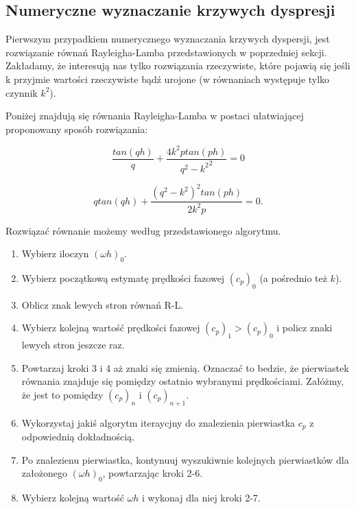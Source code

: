 
\subsection{Numeryczne wyznaczanie krzywych dyspresji}
Pierwszym przypadkiem numerycznego wyznaczania krzywych dyspersji, jest rozwiązanie równań Rayleigha-Lamba przedstawionych w poprzedniej sekcji. Zakładamy, że interesują nas tylko rozwiązania rzeczywiste, które pojawią się jeśli k przyjmie wartości rzeczywiste bądź urojone (w równaniach występuje tylko czynnik \(k^2\)).

Poniżej znajdują się równania Rayleigha-Lamba w postaci ułatwiającej proponowany sposób rozwiązania:

\begin{equation}
\frac{tan(qh)}{q}+\frac{4k^2ptan(ph)}{{q^2-k^2}^2}=0
\end{equation}

\begin{equation}
qtan(qh)+\frac{{(q^2-k^2)}^2tan(ph)}{2k^2p}=0.
\end{equation}

\vspace{5mm}

Rozwiązać równanie możemy według przedstawionego algorytmu.

\begin{enumerate}
  \item Wybierz iloczyn \((\omega h)_0\).
  \item Wybierz początkową estymatę prędkości fazowej \((c_p)_0\) (a pośrednio też \(k\)).
  \item Oblicz znak lewych stron równań R-L.
  \item Wybierz kolejną wartość prędkości fazowej \((c_p)_1 > (c_p)_0\) i policz znaki lewych stron jeszcze raz.
  \item Powtarzaj kroki 3 i 4 aż znaki się zmienią. Oznaczać to bedzie, że pierwiastek równania znajduje się pomiędzy ostatnio wybranymi prędkościami. Załóżmy, że jest to pomiędzy \( (c_p)_n \) i \( (c_p)_{n+1} \).
  \item Wykorzystaj jakiś algorytm iteraycjny do znalezienia pierwiastka \(c_p\) z odpowiednią dokładnością.
   \item Po znalezienu pierwiastka, kontynuuj wyszukiwnie kolejnych pierwiastków dla założonego \( (\omega h)_0 \), powtarzając kroki 2-6.
  \item Wybierz kolejną wartość \( \omega h \) i wykonaj dla niej kroki 2-7.
\end{enumerate}

